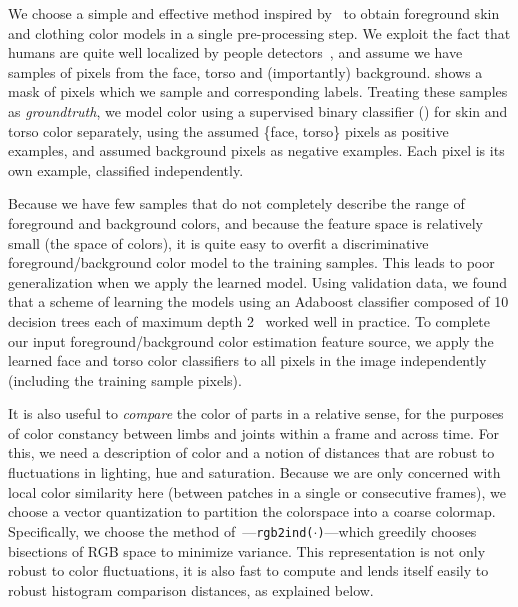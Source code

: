We choose a simple and effective method inspired by~\citet{strikeapose} to 
obtain foreground skin and clothing color models in a single pre-processing 
step.  We exploit the fact that humans are quite well localized by people 
detectors~\citep{ferrari08}, and assume we have samples of pixels from the 
face, torso and (importantly) background.   shows a mask of 
pixels which we sample and corresponding labels.  Treating these samples as 
{\em groundtruth}, we model color using a supervised binary classifier 
() for skin and torso color separately, using the assumed \{face, 
torso\} pixels as positive examples, and assumed background pixels as negative 
examples.  Each pixel is its own example, classified independently.

Because we have few samples that do not completely describe the range of 
foreground and background colors, and because the feature space is relatively 
small (the space of colors), it is quite easy to overfit a discriminative 
foreground/background color model to the training samples. This leads to poor 
generalization when we apply the learned model.  Using validation data, we 
found that a scheme of learning the models using an Adaboost classifier 
composed of 10 decision trees each of maximum depth 2~\citep{esl-book} worked 
well in practice.  To complete our input foreground/background color estimation 
feature source, we apply the learned face and torso color classifiers to all 
pixels in the image independently (including the training sample pixels).

It is also useful to {\em compare } the color of parts in a relative sense, for 
the purposes of color constancy between limbs and joints within a frame and 
across time.  For this, we need a description of color and a notion of 
distances that are robust to fluctuations in lighting, hue and saturation.  
Because we are only concerned with local color similarity here (between patches 
in a single or consecutive frames), we choose a vector quantization to 
partition the colorspace into a coarse colormap.  Specifically, we choose the 
method of~\citet{heckbert1982color}---\texttt{rgb2ind($\cdot$)}---which 
greedily chooses bisections of RGB space to minimize variance.  This 
representation is not only robust to color fluctuations, it is also fast to 
compute and lends itself easily to robust histogram comparison distances, as 
explained below.

